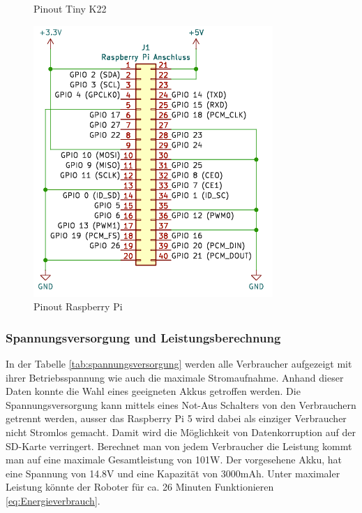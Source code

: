 \begin{figure}[h]
\begin{minipage}[b]{0.45\textwidth}
  \caption{Pinout Tiny K22}
  \label{fig:Pinout TinyK22}
\end{minipage}
\hspace{0.05\textwidth} %
\begin{minipage}[b]{0.45\textwidth}
  \centering
  \includegraphics[width=\textwidth]{assets/ET/Software/RaspyHat_Pinout.png}
  \caption{Pinout Raspberry Pi}
  \label{fig:Pinout Raspy Hat}
\end{minipage}
\end{figure}


\subsubsection{Spannungsversorgung und Leistungsberechnung}




In der Tabelle \ref{tab:spannungsversorgung} werden alle Verbraucher aufgezeigt mit ihrer Betriebsspannung wie auch die maximale Stromaufnahme. Anhand dieser Daten konnte die Wahl eines geeigneten Akkus getroffen werden. Die Spannungsversorgung kann mittels eines Not-Aus Schalters von den Verbrauchern getrennt werden, ausser das Raspberry Pi 5 wird dabei als einziger Verbraucher nicht Stromlos gemacht. Damit wird die Möglichkeit von Datenkorruption auf der SD-Karte verringert. Berechnet man von jedem Verbraucher die Leistung kommt man auf eine maximale Gesamtleistung von 101W. Der vorgesehene Akku, hat eine Spannung von 14.8V und eine Kapazität von 3000mAh. Unter maximaler Leistung könnte der Roboter für ca. 26 Minuten Funktionieren \ref{eq:Energieverbrauch}.

